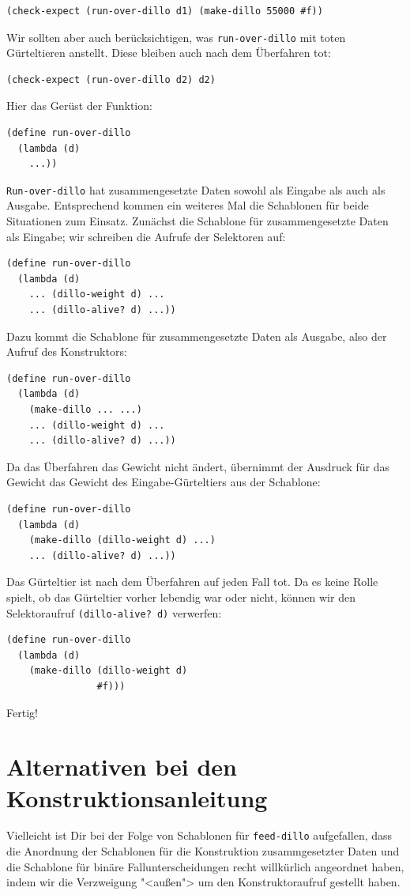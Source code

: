 %
\begin{verbatim}
(check-expect (run-over-dillo d1) (make-dillo 55000 #f))
\end{verbatim}
%
Wir sollten aber auch berücksichtigen, was \texttt{run-over-dillo} mit
toten Gürteltieren anstellt.  Diese bleiben auch nach dem Überfahren
tot:
%
\begin{verbatim}
(check-expect (run-over-dillo d2) d2)
\end{verbatim}
%
Hier das Gerüst der Funktion:
%
\begin{verbatim}
(define run-over-dillo
  (lambda (d)
    ...))
\end{verbatim}
%
\texttt{Run-over-dillo} hat zusammengesetzte Daten sowohl als Eingabe
als auch als Ausgabe.  Entsprechend kommen ein weiteres Mal die
Schablonen für beide Situationen zum Einsatz.  Zunächst die Schablone
für zusammengesetzte Daten als Eingabe; wir schreiben die Aufrufe der
Selektoren auf:
%
\begin{verbatim}
(define run-over-dillo
  (lambda (d)
    ... (dillo-weight d) ...
    ... (dillo-alive? d) ...))
\end{verbatim}
%
Dazu kommt die Schablone für zusammengesetzte Daten als Ausgabe, also
der Aufruf des Konstruktors:
%
\begin{verbatim}
(define run-over-dillo
  (lambda (d)
    (make-dillo ... ...)
    ... (dillo-weight d) ...
    ... (dillo-alive? d) ...))
\end{verbatim}
%
Da das Überfahren das Gewicht nicht ändert, übernimmt
der Ausdruck für das Gewicht das Gewicht des Eingabe-Gürteltiers aus
der Schablone:
%
\begin{verbatim}
(define run-over-dillo
  (lambda (d)
    (make-dillo (dillo-weight d) ...)
    ... (dillo-alive? d) ...))
\end{verbatim}
%
Das Gürteltier ist nach dem Überfahren auf jeden Fall tot.  Da es
keine Rolle spielt, ob das Gürteltier vorher lebendig war oder nicht,
können wir den Selektoraufruf \texttt{(dillo-alive? d)} verwerfen:
%
\begin{verbatim}
(define run-over-dillo
  (lambda (d)
    (make-dillo (dillo-weight d)
                #f)))
\end{verbatim}
%
Fertig!

\section{Alternativen bei den Konstruktionsanleitung}

Vielleicht ist Dir bei der Folge von Schablonen für
\texttt{feed-dillo} aufgefallen, dass die Anordnung der Schablonen für
die Konstruktion zusammgesetzter Daten und die Schablone für binäre
Fallunterscheidungen recht willkürlich angeordnet haben, indem wir die
Verzweigung "<außen"> um den Konstruktoraufruf gestellt haben.

